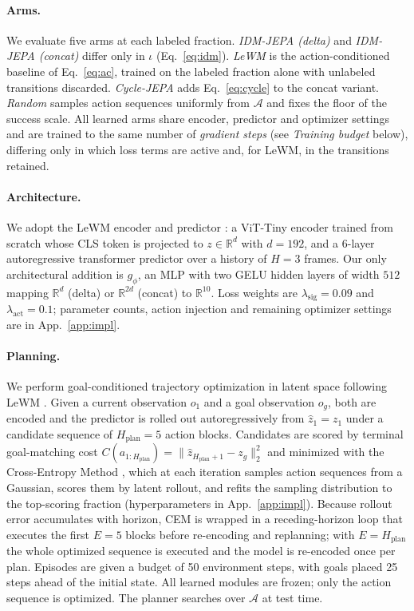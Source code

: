 \documentclass{article}
\begin{document}
\paragraph{Arms.}
We evaluate five arms at each labeled fraction. \emph{IDM-JEPA (delta)} and
\emph{IDM-JEPA (concat)} differ only in $\iota$ (Eq.~\ref{eq:idm}).
\emph{LeWM} is the action-conditioned baseline of Eq.~\ref{eq:ac}, trained on the
labeled fraction alone with unlabeled transitions discarded. \emph{Cycle-JEPA}
adds Eq.~\ref{eq:cycle} to the concat variant. \emph{Random} samples action
sequences uniformly from $\mathcal{A}$ and fixes the floor of the success scale.
All learned arms share encoder, predictor and optimizer settings and are trained to
the same number of \emph{gradient steps} (see \emph{Training budget} below),
differing only in which loss terms are active and, for LeWM, in the transitions
retained.

\paragraph{Architecture.}
We adopt the LeWM encoder and predictor \citep{sobal2025lewm}: a ViT-Tiny encoder trained
from scratch whose CLS token is projected to $z \in \mathbb{R}^{d}$ with
$d = 192$, and a $6$-layer autoregressive transformer predictor over a history of
$H = 3$ frames. Our only architectural addition is $g_\phi$, an MLP with two
GELU hidden layers of width $512$ mapping $\mathbb{R}^{d}$ (delta) or
$\mathbb{R}^{2d}$ (concat) to $\mathbb{R}^{10}$. Loss weights are $\lambda_{\mathrm{sig}} = 0.09$ and
$\lambda_{\mathrm{act}} = 0.1$; parameter counts, action injection and remaining
optimizer settings are in App.~\ref{app:impl}.

\paragraph{Planning.}
We perform goal-conditioned trajectory optimization in latent space following
LeWM \citep{sobal2025lewm}. Given a current observation $o_1$ and a goal observation $o_g$,
both are encoded and the predictor is rolled out autoregressively from
$\hat z_1 = z_1$ under a candidate sequence of $H_{\mathrm{plan}} = 5$ action
blocks. Candidates are scored by terminal goal-matching cost
$C(a_{1:H_{\mathrm{plan}}}) = \lVert \hat z_{H_{\mathrm{plan}}+1} - z_g \rVert_2^2$
and minimized with the Cross-Entropy Method \citep{rubinstein1999cem}, which at
each iteration samples action
sequences from a Gaussian, scores them by latent rollout, and refits the sampling
distribution to the top-scoring fraction (hyperparameters in App.~\ref{app:impl}).
Because rollout error accumulates with horizon, CEM is wrapped in a
receding-horizon loop that executes the first $E = 5$ blocks before
re-encoding and replanning; with $E = H_{\mathrm{plan}}$ the whole optimized
sequence is executed and the model is re-encoded once per plan. Episodes are given a budget of 50 environment
steps, with goals placed 25 steps ahead of the initial state. All learned
modules are frozen; only the action sequence is optimized. The planner
searches over $\mathcal{A}$ at test time.
\end{document}

